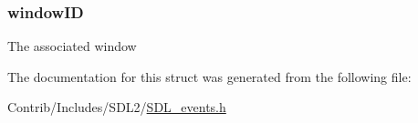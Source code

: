 \subsubsection[{\texorpdfstring{window\+ID}{windowID}}]{ window\+ID}\hypertarget{struct_s_d_l___window_event_a78d9995068d6f40cd78bb8db7351b0a1}{}\label{struct_s_d_l___window_event_a78d9995068d6f40cd78bb8db7351b0a1}
The associated window 

The documentation for this struct was generated from the following file\+:\begin{DoxyCompactItemize}
\item 
Contrib/\+Includes/\+S\+D\+L2/\hyperlink{_s_d_l__events_8h}{S\+D\+L\+\_\+events.\+h}\end{DoxyCompactItemize}
